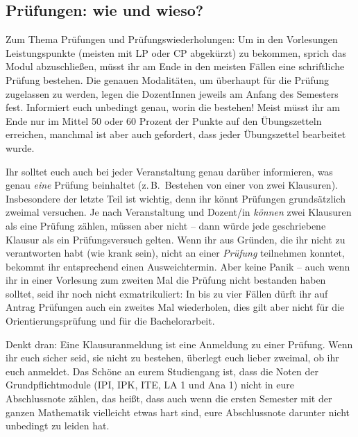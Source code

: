 \subsection{Prüfungen: wie und wieso?}

Zum Thema Prüfungen und Prüfungswiederholungen: Um in den Vorlesungen Leistungspunkte (meisten mit \gls{LP} oder \gls{CP} abgekürzt) zu bekommen, sprich das Modul abzuschließen, müsst ihr am Ende in den meisten Fällen eine schriftliche Prüfung bestehen. Die genauen Modalitäten, um überhaupt für die Prüfung zugelassen zu werden, legen die DozentInnen jeweils am Anfang des Semesters fest. Informiert euch unbedingt genau, worin die bestehen! Meist müsst ihr am Ende nur im Mittel 50 oder 60 Prozent der Punkte auf den Übungszetteln erreichen, manchmal ist aber auch gefordert, dass jeder Übungszettel bearbeitet wurde.

Ihr solltet euch auch bei jeder Veranstaltung genau darüber informieren, was genau \emph{eine} Prüfung beinhaltet (z.\,B.\ Bestehen von einer von zwei Klausuren). Insbesondere der letzte Teil ist wichtig, denn ihr könnt Prüfungen grundsätzlich zweimal versuchen. Je nach Veranstaltung und Dozent/in \emph{können} zwei Klausuren als eine Prüfung zählen, müssen aber nicht -- dann würde jede geschriebene Klausur als ein Prüfungsversuch gelten. Wenn ihr aus Gründen, die ihr nicht zu verantworten habt (wie krank sein), nicht an einer \emph{Prüfung} teilnehmen konntet, bekommt ihr entsprechend einen Ausweichtermin. Aber keine Panik -- auch wenn ihr in einer Vorlesung zum zweiten Mal die Prüfung nicht bestanden haben solltet, seid ihr noch nicht exmatrikuliert: In bis zu vier Fällen dürft ihr auf Antrag Prüfungen auch ein zweites Mal wiederholen, dies gilt aber nicht für die Orientierungsprüfung und für die Bachelorarbeit.

Denkt dran: Eine Klausuranmeldung ist eine Anmeldung zu einer Prüfung. Wenn ihr euch sicher seid, sie nicht zu bestehen, überlegt euch lieber zweimal, ob ihr euch anmeldet. Das Schöne an eurem Studiengang ist, dass die Noten der Grundpflichtmodule (IPI, IPK, ITE, LA 1 und Ana 1) nicht in eure Abschlussnote zählen, das heißt, dass auch wenn die ersten Semester mit der ganzen Mathematik vielleicht etwas hart sind, eure Abschlussnote darunter nicht unbedingt zu leiden hat.


\vspace{-\parskip}
